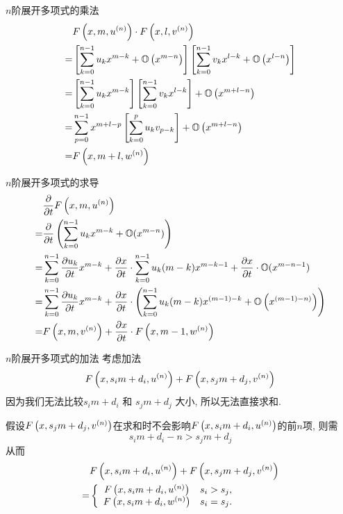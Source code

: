 
\begin{frame}{$n$阶展开多项式的乘法}
\[
\begin{aligned}
& F\left(x,m,u ^{(n)}\right)\cdot F\left(x,l,v^{(n)}\right) \\
=& \left[\sum_{k=0}^{n-1}{u_k x^{m-k}}+\mathbb O\left(x^{m-n}\right)\right]\left[\sum_{k=0}^{n-1}{v_k x^{l-k}}+\mathbb O\left(x^{l-n}\right)\right] \\
=& \left[\sum_{k=0}^{n-1}{u_k x^{m-k}}\right]\left[\sum_{k=0}^{n-1}{v_k x^{l-k}}\right]+\mathbb O\left(x^{m+l-n}\right) \\
=& \sum_{p=0}^{n-1}{x^{m+l-p}\left[\sum_{k=0}^p{u_k v_{p-k}}\right]}+\mathbb O\left(x^{m+l-n}\right) \\
=& F\left(x,m+l,w^{(n)}\right) 
\end{aligned} 
\]
\end{frame}

\begin{frame}{$n$阶展开多项式的求导}
\[
\begin{aligned}
& \frac{\partial}{\partial t}F\left(x,m,u^{(n)}\right)  \\
=& \frac{\partial}{\partial t}\left(\sum_{k=0}^{n-1}{u_k x^{m-k}}+\mathbb O(x^{m-n})\right) \\
=& \sum_{k=0}^{n-1}{\frac{\partial u_k}{\partial t}x^{m-k}}+\frac{\partial x}{\partial t}\cdot\sum_{k=0}^{n-1}{u_k (m-k) x^{m-k-1}}+\frac{\partial x}{\partial t}\cdot\mathbb O(x^{m-n-1}) \\
=& \sum_{k=0}^{n-1}{\frac{\partial u_k}{\partial t}x^{m-k}}+\frac{\partial x}{\partial t}\cdot\left(\sum_{k=0}^{n-1}{u_k (m-k) x^{(m-1)-k}}+\mathbb O\left(x^{(m-1)-n)}\right)\right) \\ 
=& F\left(x,m,v^{(n)}\right)+\frac{\partial x}{\partial t}\cdot F\left(x,m-1,w^{(n)}\right) 
\end{aligned}
\]
\end{frame}


\begin{frame}{$n$阶展开多项式的加法}
考虑加法 
\[
    F\left(x,s_i m+d_i,u^{(n)}\right)+F\left(x,s_j m+d_j,v^{(n)}\right)
\]  
因为我们无法比较$s_i m + d_i$ 和 $s_j m + d_j$ 大小, 所以无法直接求和. 

假设$F\left(x,s_j m+d_j,v^{(n)}\right)$在求和时不会影响$F\left(x,s_i m+d_i,u^{(n)}\right)$的前$n$项, 则需 
\[
    s_i m+d_i - n > s_j m+d_j 
\]
从而 
\[
\begin{aligned}
&F\left(x,s_i m+d_i,u^{(n)}\right)+F\left(x,s_j m+d_j,v^{(n)}\right) \\
=&\left\{
\begin{array}{cl}
    F\left(x,s_i m+d_i,u^{(n)}\right) & s_i>s_j,            \\
    F\left(x,s_i m+d_i,w^{(n)}\right) & s_i=s_j.
\end{array}
\right.
\end{aligned}
\]
\end{frame}

